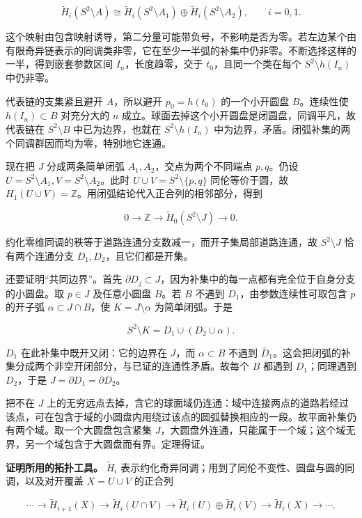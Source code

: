 \documentclass[11pt,a4paper]{article}
\begin{document}
\[
\widetilde H_i(S^2\setminus A)
\cong\widetilde H_i(S^2\setminus A_1)\oplus
\widetilde H_i(S^2\setminus A_2),\qquad i=0,1.
\]

这个映射由包含映射诱导，第二分量可能带负号，不影响是否为零。若左边某个由有限奇异链表示的同调类非零，它在至少一半弧的补集中仍非零。不断选择这样的一半，得到嵌套参数区间
\(I_n\)，长度趋零，交于 \(t_0\)，且同一个类在每个
\(S^2\setminus h(I_n)\) 中仍非零。

代表链的支集紧且避开 \(A\)，所以避开 \(p_0=h(t_0)\) 的一个小开圆盘
\(B\)。连续性使 \(h(I_n)\subset B\) 对充分大的 \(n\)
成立。球面去掉这个小开圆盘是闭圆盘，同调平凡，故代表链在
\(S^2\setminus B\) 中已为边界，也就在 \(S^2\setminus h(I_n)\)
中为边界，矛盾。闭弧补集的两个同调群因而均为零，特别地它连通。

现在把 \(J\) 分成两条简单闭弧 \(A_1,A_2\)，交点为两个不同端点
\(p,q\)。仍设 \(U=S^2\setminus A_1,V=S^2\setminus A_2\)。此时
\(U\cup V=S^2\setminus\{p,q\}\) 同伦等价于圆，故
\(H_1(U\cup V)=\mathbb Z\)。用闭弧结论代入正合列的相邻部分，得到

\[
0\longrightarrow\mathbb Z\longrightarrow
\widetilde H_0(S^2\setminus J)\longrightarrow0.
\]

约化零维同调的秩等于道路连通分支数减一，而开子集局部道路连通，故
\(S^2\setminus J\) 恰有两个连通分支 \(D_1,D_2\)，且它们都是开集。

还要证明``共同边界''。首先
\(\partial D_j\subset J\)，因为补集中的每一点都有完全位于自身分支的小圆盘。取
\(p\in J\) 及任意小圆盘 \(B\)。若 \(B\) 不遇到
\(D_1\)，由参数连续性可取包含 \(p\) 的开子弧
\(\alpha\subset J\cap B\)，使 \(K=J\setminus\alpha\) 为简单闭弧。于是

\[
S^2\setminus K=D_1\cup(D_2\cup\alpha).
\]

\(D_1\) 在此补集中既开又闭：它的边界在 \(J\)，而 \(\alpha\subset B\)
不遇到
\(\bar D_1\)。这会把闭弧的补集分成两个非空开闭部分，与已证的连通性矛盾。故每个
\(B\) 都遇到 \(D_1\)；同理遇到 \(D_2\)，于是
\(J=\partial D_1=\partial D_2\)。

把不在 \(J\)
上的无穷远点去掉，含它的球面域仍连通：域中连接两点的道路若经过该点，可在包含于域的小圆盘内用绕过该点的圆弧替换相应的一段。故平面补集仍有两个域。取一个大圆盘包含紧集
\(J\)，大圆盘外连通，只能属于一个域；这个域无界，另一个域包含于大圆盘而有界。定理得证。

\textbf{证明所用的拓扑工具。} \(\widetilde H_i\)
表示约化奇异同调；用到了同伦不变性、圆盘与圆的同调，以及对开覆盖
\(X=U\cup V\) 的正合列

\[
\cdots\longrightarrow\widetilde H_{i+1}(X)
\longrightarrow\widetilde H_i(U\cap V)
\longrightarrow\widetilde H_i(U)\oplus\widetilde H_i(V)
\longrightarrow\widetilde H_i(X)\longrightarrow\cdots.
\]
\end{document}
